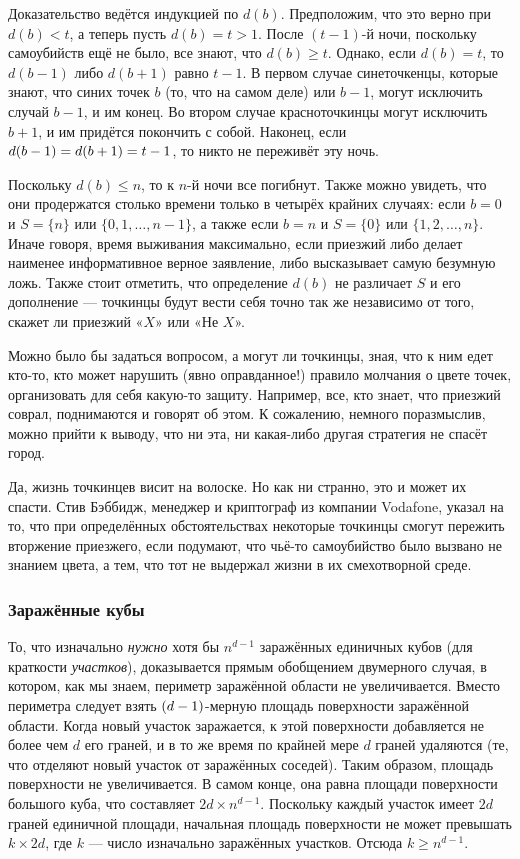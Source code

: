 Доказательство ведётся индукцией по $d(b)$.
Предположим, что это верно при $d(b)<t$, а теперь пусть $d(b)=t>1$.
После $(t-1)$-й ночи, поскольку самоубийств ещё не было, все знают, что $d(b)\ge t$.
Однако, если $d(b)=t$, то $d(b-1)$ либо $d(b+1)$ равно $t-1$.
В первом случае синеточкенцы, которые знают, что синих точек $b$ (то, что на самом деле) или $b-1$, 
могут исключить случай $b-1$, и им конец.
Во втором случае красноточкинцы могут исключить $b+1$, и им придётся покончить с собой.
Наконец, если $d(b-1)\z=d(b+1)=t-1$, то никто не переживёт эту ночь.

Поскольку $d(b) \le n$, то к $n$-й ночи все погибнут.
Также можно увидеть, что они продержатся столько времени только в четырёх крайних случаях:
если $b=0$ и $S=\{n\}$ или $\{0,1,\dots,n-1\}$,
а также если $b=n$ и $S=\{0\}$ или $\{1,2,\dots,n\}$.
Иначе говоря, время выживания максимально, если приезжий либо делает наименее информативное верное заявление,
либо высказывает самую безумную ложь.
Также стоит отметить, что определение $d(b)$ не различает $S$ и его дополнение --- точкинцы будут вести себя точно так же независимо от того, скажет ли приезжий «$X$» или «Не $X$».

Можно было бы задаться вопросом, а могут ли точкинцы, зная, что к ним едет кто-то, кто может нарушить (явно оправданное!) правило молчания о цвете точек, организовать для себя какую-то защиту.
Например, все, кто знает, что приезжий соврал, поднимаются и говорят об этом.
К сожалению, немного поразмыслив, можно прийти к выводу, что ни эта, ни какая-либо другая стратегия не спасёт город.

Да, жизнь точкинцев висит на волоске.
Но как ни странно, это и может их спасти.
Стив Бэббидж, менеджер и криптограф из компании Vodafone, указал на то, что при определённых обстоятельствах некоторые точкинцы смогут пережить вторжение приезжего, если подумают, что чьё-то самоубийство было вызвано не знанием цвета, а тем, что тот не выдержал жизни в их смехотворной среде.

\subsubsection*{Заражённые кубы}

То, что изначально \emph{нужно} хотя бы $n^{d-1}$ заражённых единичных кубов (для краткости \emph{участков}), доказывается прямым обобщением двумерного случая, в котором, как мы знаем, периметр заражённой области не увеличивается.
Вместо периметра следует взять $(d\z-1)$-мерную площадь поверхности заражённой области.
Когда новый участок заражается, к этой поверхности добавляется не более чем $d$ его граней,
и в то же время по крайней мере $d$ граней удаляются (те, что отделяют новый участок от заражённых соседей).
Таким образом, площадь поверхности не увеличивается.
В самом конце, она равна площади поверхности большого куба, что составляет $2d \times n^{d-1}$.
Поскольку каждый участок имеет $2d$ граней единичной площади,
начальная площадь поверхности не может превышать $k \times 2d$,
где $k$ --- число изначально заражённых участков.
Отсюда $k\geqslant n^{d-1}$.

